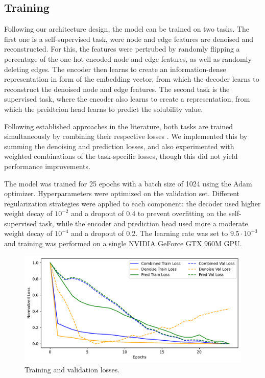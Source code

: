 \documentclass[11pt,a4paper]{article}
\begin{document}
\subsection{Training}

Following our architecture design, the model can be trained on two tasks. The first one is a self-supervised task, were node and edge features are denoised and reconstructed. For this, the features were pertrubed by randomly flipping a percentage of the one-hot encoded node and edge features, as well as randomly deleting edges. The encoder then learns to create an information-dense representation in form of the embedding vector, from which the decoder learns to reconstruct the denoised node and edge features. The second task is the supervised task, where the encoder also learns to create a representation, from which the preidtcion head learns to predict the solubility value.

Following established approaches in the literature, both tasks are trained simultaneously by combining their respective losses \cite{cui2025online, wang2022test}. We implemented this by summing the denoising and prediction losses, and also experimented with weighted combinations of the task-specific losses, though this did not yield performance improvements.

The model was trained for 25 epochs with a batch size of 1024 using the Adam optimizer. Hyperparameters were optimized on the validation set. Different regularization strategies were applied to each component: the decoder used higher weight decay of $10^{-2}$ and a dropout of 0.4 to prevent overfitting on the self-supervised task, while the encoder and prediction head used more a moderate weight decay of $10^{-4}$ and a dropout of 0.2. The learning rate was set to $9.5 \cdot 10^{-3}$ and training was performed on a single NVIDIA GeForce GTX 960M GPU.

\begin{figure}[htbp]
        \centering
        \includegraphics[width=1\textwidth]{loss_plot.pdf}
        \caption{Training and validation losses.}
        \label{fig:loss_plot}
\end{figure}
\end{document}
